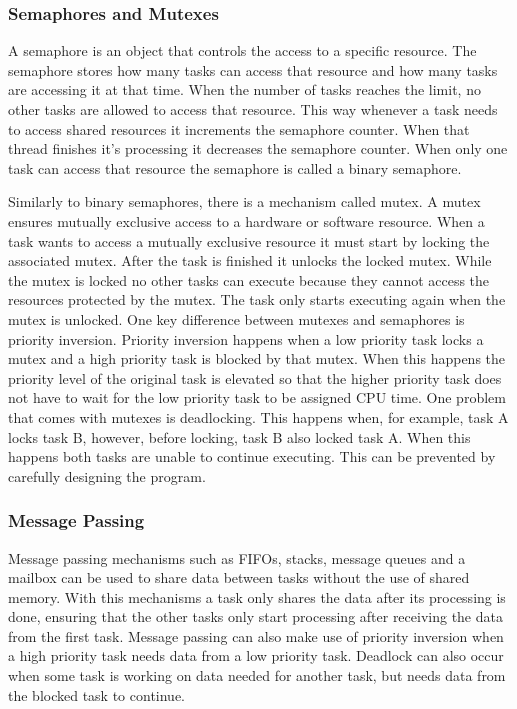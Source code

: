 \subsubsection{Semaphores and Mutexes}
A semaphore is an object that controls the access to a specific resource. The semaphore stores how many tasks can access that resource and how many tasks are accessing it at that time. When the number of tasks reaches the limit, no other tasks are allowed to access that resource. This way whenever a task needs to access shared resources it increments the semaphore counter. When that thread finishes it's processing it decreases the semaphore counter. When only one task can access that resource the semaphore is called a binary semaphore.

Similarly to binary semaphores, there is a mechanism called mutex. A mutex ensures mutually exclusive access to a hardware or software resource. When a task wants to access a mutually exclusive resource it must start by locking the associated mutex. After the task is finished it unlocks the locked mutex. While the mutex is locked no other tasks can execute because they cannot access the resources protected by the mutex. The task only starts executing again when the mutex is unlocked. One key difference between mutexes and semaphores is priority inversion. Priority inversion happens when a low priority task locks a mutex and a high priority task is blocked by that mutex. When this happens the priority level of the original task is elevated so that the higher priority task does not have to wait for the low priority task to be assigned CPU time. One problem that comes with mutexes is deadlocking. This happens when, for example, task A locks task B, however, before locking, task B also locked task A. When this happens both tasks are unable to continue executing. This can be prevented by carefully designing the program.

\subsubsection{Message Passing}
Message passing mechanisms such as FIFOs, stacks, message queues and a mailbox can be used to share data between tasks without the use of shared memory. With this mechanisms a task only shares the data after its processing is done, ensuring that the other tasks only start processing after receiving the data from the first task. Message passing can also make use of priority inversion when a high priority task needs data from a low priority task. Deadlock can also occur when some task is working on data needed for another task, but needs data from the blocked task to continue.

